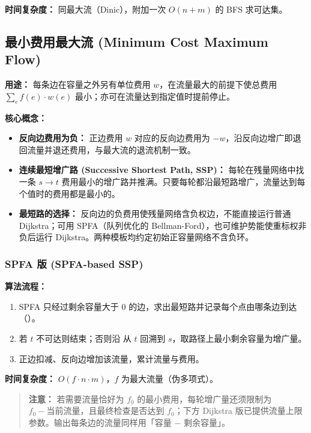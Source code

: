 \textbf{时间复杂度：} 同最大流（Dinic），附加一次 $O(n+m)$ 的 BFS 求可达集。



\subsection{最小费用最大流 (Minimum Cost Maximum Flow)}

\textbf{用途：} 每条边在容量之外另有单位费用 $w$，在流量最大的前提下使总费用 $\sum_e f(e) \cdot w(e)$ 最小；亦可在流量达到指定值时提前停止。

\textbf{核心概念：}
\begin{itemize}
  \item \textbf{反向边费用为负：} 正边费用 $w$ 对应的反向边费用为 $-w$，沿反向边增广即退回流量并退还费用，与最大流的退流机制一致。
  \item \textbf{连续最短增广路 (Successive Shortest Path, SSP)：} 每轮在残量网络中找一条 $s \to t$ 费用最小的增广路并推满。只要每轮都沿最短路增广，流量达到每个值时的费用都是最小的。
  \item \textbf{最短路的选择：} 反向边的负费用使残量网络含负权边，不能直接运行普通 Dijkstra；可用 SPFA（队列优化的 Bellman-Ford），也可维护势能使重标权非负后运行 Dijkstra。两种模板均约定初始正容量网络不含负环。
\end{itemize}

\subsubsection{SPFA 版 (SPFA-based SSP)}

\textbf{算法流程：}
\begin{enumerate}
  \item SPFA 只经过剩余容量大于 $0$ 的边，求出最短路并记录每个点由哪条边到达（）。
  \item 若 $t$ 不可达则结束；否则沿  从 $t$ 回溯到 $s$，取路径上最小剩余容量为增广量。
  \item 正边扣减、反向边增加该流量，累计流量与费用。
\end{enumerate}

\textbf{时间复杂度：} $O(f \cdot n \cdot m)$，$f$ 为最大流量（伪多项式）。

\begin{quote}
\textbf{注意：} 若需要流量恰好为 $f_0$ 的最小费用，每轮增广量还须限制为 $f_0-\text{当前流量}$，且最终检查是否达到 $f_0$；下方 Dijkstra 版已提供流量上限参数。输出每条边的流量同样用「容量 $-$ 剩余容量」。
\end{quote}

